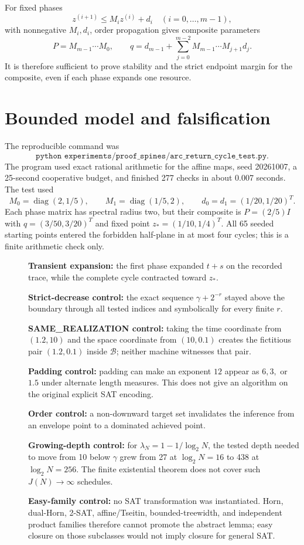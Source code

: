 \documentclass[11pt]{article}
\newcommand{\B}{\mathcal B}
\begin{document}
For fixed phases
\[
z^{(i+1)}\le M_i z^{(i)}+d_i
\quad (i=0,\ldots,m-1),
\]
with nonnegative $M_i,d_i$, order propagation gives composite parameters
\[
P=M_{m-1}\cdots M_0,
\qquad
q=d_{m-1}+\sum_{j=0}^{m-2}M_{m-1}\cdots M_{j+1}d_j.
\]
It is therefore sufficient to prove stability and the strict endpoint margin
for the composite, even if each phase expands one resource.

\section{Bounded model and falsification}
The reproducible command was
\[
\texttt{python experiments/proof\_spines/arc\_return\_cycle\_test.py}.
\]
The program used exact rational arithmetic for the affine maps, seed
20261007, a 25-second cooperative budget, and finished 277 checks in about
0.007 seconds. The test used
\[
M_0=\operatorname{diag}(2,1/5),\qquad
M_1=\operatorname{diag}(1/5,2),\qquad
d_0=d_1=(1/20,1/20)^T.
\]
Each phase matrix has spectral radius two, but their composite is
$P=(2/5)I$ with $q=(3/50,3/20)^T$ and fixed point
$z_*=(1/10,1/4)^T$. All 65 seeded starting points entered the forbidden
half-plane in at most four cycles; this is a finite arithmetic check only.

\begin{description}
\item[] \textbf{Transient expansion:} the first phase expanded $t+s$ on the
recorded trace, while the complete cycle contracted toward $z_*$.
\item[] \textbf{Strict-decrease control:} the exact sequence
$\gamma+2^{-r}$ stayed above the boundary through all tested indices and
symbolically for every finite $r$.
\item[] \textbf{SAME\_REALIZATION control:} taking the time coordinate from
$(1.2,10)$ and the space coordinate from $(10,0.1)$ creates the fictitious
pair $(1.2,0.1)$ inside $\B$; neither machine witnesses that pair.
\item[] \textbf{Padding control:} padding can make an exponent $12$ appear as
$6,3,$ or $1.5$ under alternate length measures. This does not give an
algorithm on the original explicit SAT encoding.
\item[] \textbf{Order control:} a non-downward target set invalidates the
inference from an envelope point to a dominated achieved point.
\item[] \textbf{Growing-depth control:} for
$\lambda_N=1-1/\log_2N$, the tested depth needed to move from 10 below
$\gamma$ grew from 27 at $\log_2N=16$ to 438 at $\log_2N=256$. The finite
existential theorem does not cover such $J(N)\to\infty$ schedules.
\item[] \textbf{Easy-family control:} no SAT transformation was instantiated.
Horn, dual-Horn, 2-SAT, affine/Tseitin, bounded-treewidth, and independent
product families therefore cannot promote the abstract lemma; easy closure on
those subclasses would not imply closure for general SAT.
\end{description}
\end{document}
